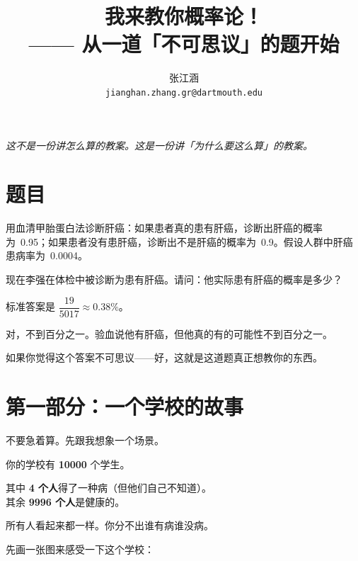 \documentclass[12pt,a4paper]{article}
\title{\sffamily\Huge 我来教你概率论！\\[6pt]
\large —— 从一道「不可思议」的题开始}
\author{张江涵\\\small\texttt{jianghan.zhang.gr@dartmouth.edu}}
\date{}
\begin{document}
\maketitle
\thispagestyle{empty}

\vspace{-1cm}

\begin{center}
\textit{\small 这不是一份讲怎么算的教案。这是一份讲「为什么要这么算」的教案。}
\end{center}

\vspace{0.5cm}

\section*{题目}

\begin{storybox}[原题]
用血清甲胎蛋白法诊断肝癌：如果患者真的患有肝癌，诊断出肝癌的概率为~0.95；如果患者没有患肝癌，诊断出不是肝癌的概率为~0.9。假设人群中肝癌患病率为~0.0004。

现在李强在体检中被诊断为患有肝癌。请问：他实际患有肝癌的概率是多少？
\end{storybox}

标准答案是 $\dfrac{19}{5017} \approx 0.38\%$。

对，不到百分之一。验血说他有肝癌，但他真的有的可能性不到百分之一。

如果你觉得这个答案不可思议——好，这就是这道题真正想教你的东西。

\section*{第一部分：一个学校的故事}

不要急着算。先跟我想象一个场景。

\begin{storybox}[想象一所超大的学校]
你的学校有 \textbf{10000} 个学生。

其中 \textbf{4 个人}得了一种病（但他们自己不知道）。\\
其余 \textbf{9996 个人}是健康的。

所有人看起来都一样。你分不出谁有病谁没病。
\end{storybox}

先画一张图来感受一下这个学校：
\end{document}
